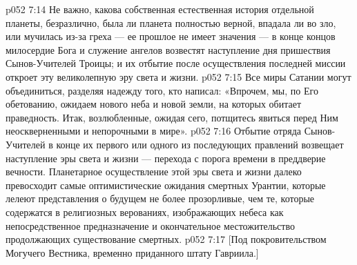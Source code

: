 \vs p052 7:14 \pc Не важно, какова собственная естественная история отдельной планеты, безразлично, была ли планета полностью верной, впадала ли во зло, или мучилась из\hyp{}за греха --- ее прошлое не имеет значения --- в конце концов милосердие Бога и служение ангелов возвестят наступление дня пришествия Сынов\hyp{}Учителей Троицы; и их отбытие после осуществления последней миссии откроет эту великолепную эру света и жизни.
\vs p052 7:15 Все миры Сатании могут объединиться, разделяя надежду того, кто написал: «Впрочем, мы, по Его обетованию, ожидаем нового неба и новой земли, на которых обитает праведность. Итак, возлюбленные, ожидая сего, потщитесь явиться перед Ним неоскверненными и непорочными в мире».
\vs p052 7:16 \pc Отбытие отряда Сынов\hyp{}Учителей в конце их первого или одного из последующих правлений возвещает наступление эры света и жизни --- перехода с порога времени в преддверие вечности. Планетарное осуществление этой эры света и жизни далеко превосходит самые оптимистические ожидания смертных Урантии, которые лелеют представления о будущем не более прозорливые, чем те, которые содержатся в религиозных верованиях, изображающих небеса как непосредственное предназначение и окончательное местожительство продолжающих существование смертных.
\vsetoff
\vs p052 7:17 [Под покровительством Могучего Вестника, временно приданного штату Гавриила.]
